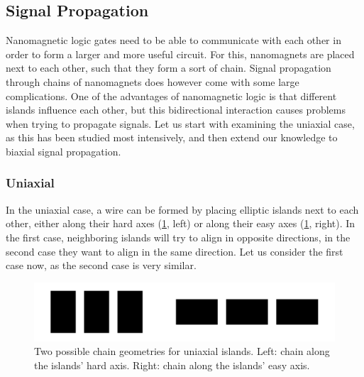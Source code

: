 \documentclass[10pt,a4paper]{article}
\begin{document}
\subsection{Signal Propagation}
Nanomagnetic logic gates need to be able to communicate with each other in order to form a larger and more useful circuit. For this, nanomagnets are placed next to each other, such that they form a sort of chain. Signal propagation through chains of nanomagnets does however come with some large complications. One of the advantages of nanomagnetic logic is that different islands influence each other, but this bidirectional interaction causes problems when trying to propagate signals. Let us start with examining the uniaxial case, as this has been studied most intensively, and then extend our knowledge to biaxial signal propagation.
\subsubsection{Uniaxial}
In the uniaxial case, a wire can be formed by placing elliptic islands next to each other, either along their hard axes (\cref{fig:Intro_IslandEllipticChainGeometries}, left) or along their easy axes (\cref{fig:Intro_IslandEllipticChainGeometries}, right). In the first case, neighboring islands will try to align in opposite directions, in the second case they want to align in the same direction. Let us consider the first case now, as the second case is very similar. %
\begin{figure}
    \centering
    \includegraphics[width=0.5\columnwidth]{Figures/Introduction/Chains_geometries.pdf}
    \caption{Two possible chain geometries for uniaxial islands. Left: chain along the islands' hard axis. Right: chain along the islands' easy axis.}
    \label{fig:Intro_IslandEllipticChainGeometries}
\end{figure}
\end{document}
